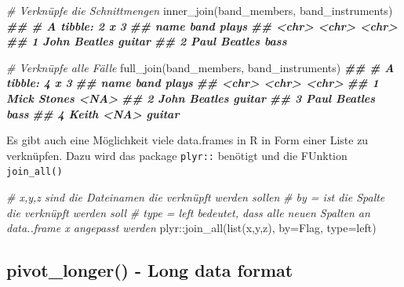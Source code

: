 \documentclass[
]{article}
\newenvironment{Shaded}{\begin{snugshade}}{\end{snugshade}}
\newcommand{\AttributeTok}[1]{\textcolor[rgb]{0.77,0.63,0.00}{#1}}
\newcommand{\CommentTok}[1]{\textcolor[rgb]{0.56,0.35,0.01}{\textit{#1}}}
\newcommand{\DocumentationTok}[1]{\textcolor[rgb]{0.56,0.35,0.01}{\textbf{\textit{#1}}}}
\newcommand{\FunctionTok}[1]{\textcolor[rgb]{0.00,0.00,0.00}{#1}}
\newcommand{\NormalTok}[1]{#1}
\newcommand{\SpecialCharTok}[1]{\textcolor[rgb]{0.00,0.00,0.00}{#1}}
\newcommand{\StringTok}[1]{\textcolor[rgb]{0.31,0.60,0.02}{#1}}
\begin{document}
\begin{Shaded}
\begin{Highlighting}[]
\CommentTok{\# Verknüpfe die Schnittmengen}
\FunctionTok{inner\_join}\NormalTok{(band\_members, band\_instruments)}
\DocumentationTok{\#\# \# A tibble: 2 x 3}
\DocumentationTok{\#\#   name  band    plays }
\DocumentationTok{\#\#   \textless{}chr\textgreater{} \textless{}chr\textgreater{}   \textless{}chr\textgreater{} }
\DocumentationTok{\#\# 1 John  Beatles guitar}
\DocumentationTok{\#\# 2 Paul  Beatles bass}

\CommentTok{\# Verknüpfe alle Fälle}
\FunctionTok{full\_join}\NormalTok{(band\_members, band\_instruments)}
\DocumentationTok{\#\# \# A tibble: 4 x 3}
\DocumentationTok{\#\#   name  band    plays }
\DocumentationTok{\#\#   \textless{}chr\textgreater{} \textless{}chr\textgreater{}   \textless{}chr\textgreater{} }
\DocumentationTok{\#\# 1 Mick  Stones  \textless{}NA\textgreater{}  }
\DocumentationTok{\#\# 2 John  Beatles guitar}
\DocumentationTok{\#\# 3 Paul  Beatles bass  }
\DocumentationTok{\#\# 4 Keith \textless{}NA\textgreater{}    guitar}
\end{Highlighting}
\end{Shaded}

Es gibt auch eine Möglichkeit viele data.frames in R in Form einer Liste zu verknüpfen. Dazu wird das package \texttt{plyr::} benötigt und die FUnktion \texttt{join\_all()}

\begin{Shaded}
\begin{Highlighting}[]
\CommentTok{\# x,y,z sind die Dateinamen die verknüpft werden sollen}
\CommentTok{\# by = ist die Spalte die verknüpft werden soll}
\CommentTok{\# type = left bedeutet, dass alle neuen Spalten an data..frame x angepasst werden}
\NormalTok{plyr}\SpecialCharTok{::}\FunctionTok{join\_all}\NormalTok{(}\FunctionTok{list}\NormalTok{(x,y,z), }\AttributeTok{by=}\StringTok{\textquotesingle{}Flag\textquotesingle{}}\NormalTok{, }\AttributeTok{type=}\StringTok{\textquotesingle{}left\textquotesingle{}}\NormalTok{) }
\end{Highlighting}
\end{Shaded}

\hypertarget{pivot_longer---long-data-format}{%
\subsection{pivot\_longer() - Long data format}\label{pivot_longer---long-data-format}}
\end{document}
